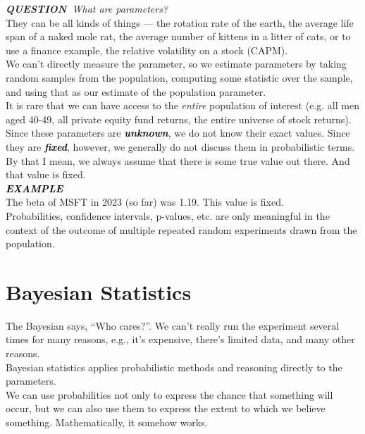 \documentclass[14pt]{extarticle}
\newcommand{\mynotes}[2][Gray]{\textcolor{#1}{\textbf{\textit{#2}}}}
\newcommand{\question}[1]{\textit{\textbf{QUESTION~}#1}}
\newcommand{\example}{\mynotes[black]{EXAMPLE~} \\}
\begin{document}
\question{What are parameters?} \\
They can be all kinds of things — the rotation rate of the earth, the average life span of a naked mole rat, the average number of kittens in a litter of cats, or to use a finance example, the relative volatility on a stock (CAPM). \\

We can't directly measure the parameter, so we estimate parameters by taking random samples from the population, computing some statistic over the sample, and using that as our estimate of the population parameter. \\

It is rare that we can have access to the \textit{entire} population of interest (e.g. all men aged 40-49, all private equity fund returns, the entire universe of stock returns). \\

Since these parameters are \mynotes[black]{unknown}, we do not know their exact values. Since they are \mynotes[black]{fixed}, however, we generally do not discuss them in probabilistic terms. By that I mean, we always assume that there is some true value out there. And that value is fixed. \\

\example The beta of MSFT in 2023 (so far) was 1.19. This value is fixed. \\ 


Probabilities, confidence intervals, p-values, etc. are only meaningful in the context of the outcome of multiple repeated random experiments drawn from the population.


\section{Bayesian Statistics}

The Bayesian says, ``Who cares?''. We can't really run the experiment several times for many reasons, e.g., it's expensive, there's limited data, and many other reasons. \\

Bayesian statistics applies probabilistic methods and reasoning directly to the parameters. \\

We can use probabilities not only to express the chance that something will occur, but we can also use them to express the extent to which we believe something. Mathematically, it somehow works. \\
\end{document}
